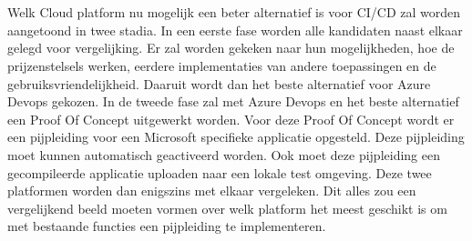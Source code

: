 
\section{}
\label{sec:onderzoeksdoelstelling}
Welk Cloud platform nu mogelijk een beter alternatief is voor CI/CD zal worden aangetoond in twee stadia. In een eerste fase worden alle kandidaten naast elkaar gelegd voor vergelijking. Er zal worden gekeken naar hun mogelijkheden, hoe de prijzenstelsels werken, eerdere implementaties van andere toepassingen en de gebruiksvriendelijkheid. Daaruit wordt dan het beste alternatief voor Azure Devops gekozen. In de tweede fase zal met Azure Devops en het beste alternatief een Proof Of Concept uitgewerkt worden. Voor deze Proof Of Concept wordt er een pijpleiding voor een Microsoft specifieke applicatie opgesteld. Deze pijpleiding moet kunnen automatisch geactiveerd worden. Ook moet deze pijpleiding een gecompileerde applicatie uploaden naar een lokale test omgeving. Deze twee platformen worden dan enigszins met elkaar vergeleken. Dit alles zou een vergelijkend beeld moeten vormen over welk platform het meest geschikt is om met bestaande functies een pijpleiding te implementeren.


\section{}
\label{sec:opzet-bachelorproef}


